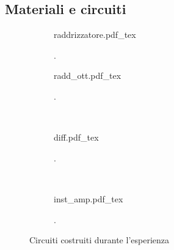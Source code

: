 \subsection{Materiali e circuiti}

\begin{figure*}[b!]
        \centering
        \small
        \begin{subfigure}[b]{0.43\textwidth}
            \def\svgwidth{\columnwidth}
            {raddrizzatore.pdf_tex}
            \caption{.}
            \label{fig:raddrizzatore5}
        \end{subfigure}
        \quad
        \begin{subfigure}[b]{0.53\textwidth}
            \def\svgwidth{\columnwidth}
            {radd_ott.pdf_tex}
            \caption{.}
            \label{fig:rad_ott5}
        \end{subfigure}
        ~
        \begin{subfigure}[b]{0.48\textwidth}
            \def\svgwidth{\columnwidth}
            {diff.pdf_tex}
            \caption{.}
            \label{fig:diff5}
        \end{subfigure}
        ~
        \begin{subfigure}[b]{0.48\textwidth}
            \def\svgwidth{\columnwidth}
            {inst_amp.pdf_tex}
            \caption{.}
            \label{fig:inst_amp5}
        \end{subfigure}

        \caption{Circuiti costruiti durante l'esperienza}
        \label{fig:circuits4}
\end{figure*}
